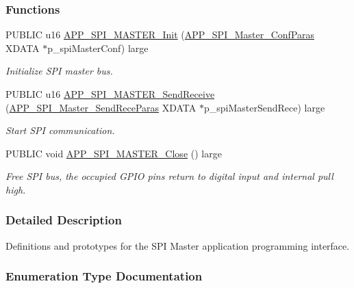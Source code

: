 \subsubsection*{Functions}
\begin{DoxyCompactItemize}
\item 
P\+U\+B\+L\+IC u16 \hyperlink{group___s_p_i___m_a_s_t_e_r_ga163d9aab00fb66cec9b8a378213ef676}{A\+P\+P\+\_\+\+S\+P\+I\+\_\+\+M\+A\+S\+T\+E\+R\+\_\+\+Init} (\hyperlink{struct_a_p_p___s_p_i___master___conf_paras}{A\+P\+P\+\_\+\+S\+P\+I\+\_\+\+Master\+\_\+\+Conf\+Paras} X\+D\+A\+TA $\ast$p\+\_\+spi\+Master\+Conf) large
\begin{DoxyCompactList}\small\item\em Initialize S\+PI master bus. \end{DoxyCompactList}\item 
P\+U\+B\+L\+IC u16 \hyperlink{group___s_p_i___m_a_s_t_e_r_gabb4ce9647caadd5bc70bb4d6e02beae2}{A\+P\+P\+\_\+\+S\+P\+I\+\_\+\+M\+A\+S\+T\+E\+R\+\_\+\+Send\+Receive} (\hyperlink{struct_a_p_p___s_p_i___master___send_rece_paras}{A\+P\+P\+\_\+\+S\+P\+I\+\_\+\+Master\+\_\+\+Send\+Rece\+Paras} X\+D\+A\+TA $\ast$p\+\_\+spi\+Master\+Send\+Rece) large
\begin{DoxyCompactList}\small\item\em Start S\+PI communication. \end{DoxyCompactList}\item 
P\+U\+B\+L\+IC void \hyperlink{group___s_p_i___m_a_s_t_e_r_gad98112744dc797370e7aae9becaeae58}{A\+P\+P\+\_\+\+S\+P\+I\+\_\+\+M\+A\+S\+T\+E\+R\+\_\+\+Close} () large\hypertarget{group___s_p_i___m_a_s_t_e_r_gad98112744dc797370e7aae9becaeae58}{}\label{group___s_p_i___m_a_s_t_e_r_gad98112744dc797370e7aae9becaeae58}

\begin{DoxyCompactList}\small\item\em Free S\+PI bus, the occupied G\+P\+IO pins return to digital input and internal pull high. \end{DoxyCompactList}\end{DoxyCompactItemize}


\subsubsection{Detailed Description}
Definitions and prototypes for the S\+PI Master application programming interface. 



\subsubsection{Enumeration Type Documentation}
